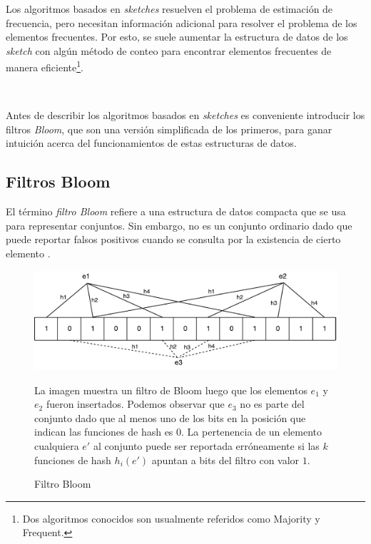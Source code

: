 \documentclass[a4paper,10pt, oneside]{article}
\begin{document}
Los algoritmos basados en \textit{sketches} resuelven el problema de estimación de frecuencia, pero necesitan información adicional para resolver el problema de los elementos frecuentes. Por esto, se suele aumentar la estructura de datos de los \textit{sketch} con algún método de conteo para encontrar elementos frecuentes de manera eficiente\footnote{Dos algoritmos conocidos son usualmente referidos como Majority y Frequent.}.

\

Antes de describir los algoritmos basados en \textit{sketches} es conveniente introducir los filtros \textit{Bloom}, que son una versión simplificada de los primeros, para ganar intuición acerca del funcionamientos de estas estructuras de datos.

\subsection{Filtros Bloom}

El término \textit{filtro Bloom} refiere a una estructura de datos compacta que se usa para representar conjuntos. Sin embargo, no es un conjunto ordinario dado que puede reportar falsos positivos cuando se consulta por la existencia de cierto elemento \cite{Putze:2010:CHS:1498698.1594230}.

\begin{figure}[htbp]
	\centering
	\includegraphics[scale=0.8]{graph/bloomFilter.pdf}
	\caption{Filtro Bloom}
	
	\medskip
	\small
	
	\parbox{13.1cm}{La imagen muestra un filtro de Bloom luego que los elementos $e_1$ y $e_2$ fueron insertados. Podemos observar que $e_3$ no es parte del conjunto dado que al menos uno de los bits en la posición que indican las funciones de hash es $0$. La pertenencia de un elemento cualquiera $e'$ al conjunto puede ser reportada erróneamente si las $k$ funciones de hash $h_i(e')$ apuntan a bits del filtro con valor $1$.}
	
\end{figure}
\end{document}
